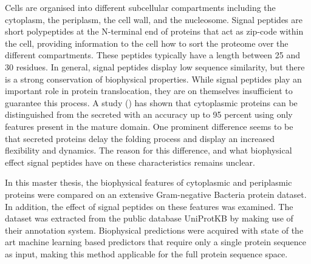Cells are organised into different subcellular compartments including
the cytoplasm, the periplasm, the cell wall, and the nucleosome.
Signal peptides are short polypeptides at the N-terminal end of proteins that act as zip-code within the cell,
providing information to the cell how to sort the proteome over the different compartments.
These peptides typically have a length between 25 and 30 residues.
In general, signal peptides display low sequence similarity,
but there is a strong conservation of biophysical properties.
While signal peptides play an important role in protein translocation,
they are on themselves insufficient to guarantee this process.
A study (\cite{orfanoudaki2017}) has shown that cytoplasmic proteins can be distinguished from the secreted with an accuracy up to 95 percent using only features present in the mature domain.
One prominent difference seems to be that secreted proteins delay the folding process 
and display an increased flexibility and dynamics.
The reason for this difference, and what biophysical effect signal peptides have on these characteristics remains unclear.

In this master thesis,
the biophysical features of cytoplasmic and periplasmic proteins were compared on an extensive Gram-negative Bacteria protein dataset.
In addition, the effect of signal peptides on these features was examined.
The dataset was extracted from the public database UniProtKB by making use of their annotation system.
Biophysical predictions were acquired with state of the art machine learning based predictors that require only a single protein sequence as input,
making this method applicable for the full protein sequence space.

